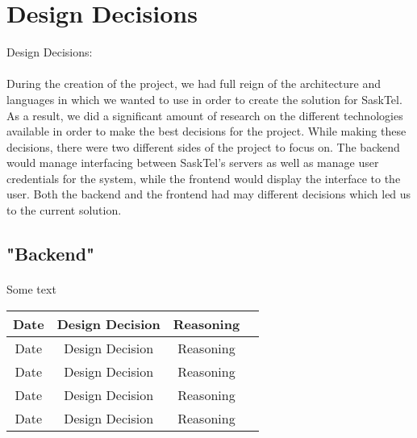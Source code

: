 \documentclass[12pt]{article}
\begin{document}

\newpage
\section{Design Decisions}
Design Decisions:
\paragraph{}
	During the creation of the project, we had full reign of the architecture and languages in which we wanted to use in order to create the solution for SaskTel. As a result, we did a significant amount of research on the different technologies available in order to make the best decisions for the project. While making these decisions, there were two different sides of the project to focus on. The backend would manage interfacing between SaskTel's servers as well as manage user credentials for the system, while the frontend would display the interface to the user. Both the backend and the frontend had may different decisions which led us to the current solution.
\subsection{"Backend"}
\paragraph{}
	Some text



		\begin{center}
		\begin{tabular}{ |c|c|c|c| } 
		\hline
		Date & Design Decision & Reasoning \\
		\hline
		Date & Design Decision & Reasoning \\
		\hline
		Date & Design Decision & Reasoning \\
		\hline
		Date & Design Decision & Reasoning \\
		\hline
		Date & Design Decision & Reasoning \\
		\hline
		\end{tabular}
		\end{center}	
	
\end{document}
